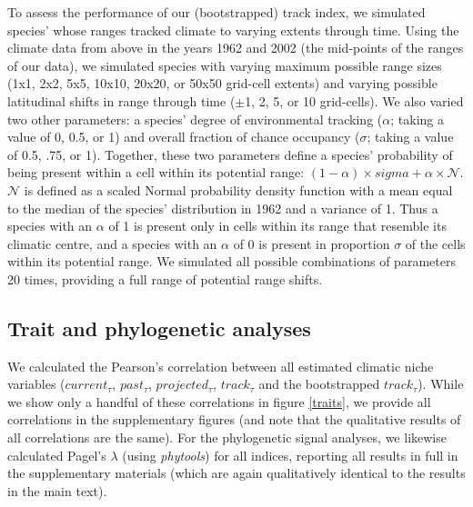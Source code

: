 \documentclass[12pt]{report}
\begin{document}
To assess the performance of our (bootstrapped) track index, we
simulated species' whose ranges tracked climate to varying extents
through time. Using the climate data from above in the years 1962 and
2002 (the mid-points of the ranges of our data), we simulated species
with varying maximum possible range sizes (1x1, 2x2, 5x5, 10x10,
20x20, or 50x50 grid-cell extents) and varying possible latitudinal
shifts in range through time ($\pm$1, 2, 5, or 10 grid-cells). We also
varied two other parameters: a species' degree of environmental
tracking ($\alpha$; taking a value of 0, 0.5, or 1) and overall
fraction of chance occupancy ($\sigma$; taking a value of 0.5, .75, or
1). Together, these two parameters define a species' probability of
being present within a cell within its potential range:
$(1-\alpha) \times sigma + \alpha \times \mathcal{N}$.  $\mathcal{N}$
is defined as a scaled Normal probability density function with a mean
equal to the median of the species' distribution in 1962 and a
variance of 1. Thus a species with an $\alpha$ of 1 is present only in
cells within its range that resemble its climatic centre, and a
species with an $\alpha$ of 0 is present in proportion $\sigma$ of the
cells within its potential range. We simulated all possible
combinations of parameters 20 times, providing a full range of
potential range shifts.

\subsection*{Trait and phylogenetic analyses}

We calculated the Pearson's correlation between all estimated climatic
niche variables ($current_\tau$, $past_\tau$, $projected_\tau$,
$track_\tau$ and the bootstrapped $track_\tau$). While we show only a
handful of these correlations in figure \ref{traits}, we provide all
correlations in the supplementary figures (and note that the
qualitative results of all correlations are the same). For the
phylogenetic signal analyses, we likewise calculated Pagel's $\lambda$
(using \emph{phytools}\supercite{Revell2012phytools}) for all indices,
reporting all results in full in the supplementary materials (which
are again qualitatively identical to the results in the main text).

\printbibliography
\end{document}
